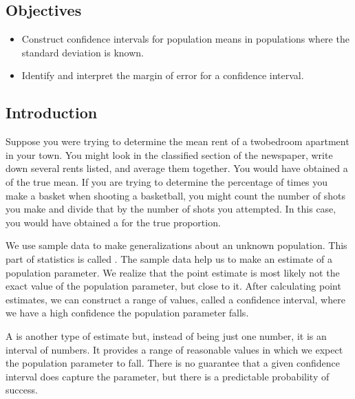 \documentclass[letterpaper,10pt,english]{jupyterBook}
\begin{document}
\subsection{Objectives}
\label{\detokenize{Ch5 Confidence Intervals/5.1 Estimating Population Means (Sigma Known):objectives}}\begin{itemize}
\item {} 
\sphinxAtStartPar
Construct confidence intervals for population means in populations where the standard deviation is known.

\item {} 
\sphinxAtStartPar
Identify and interpret the margin of error for a confidence interval.

\end{itemize}


\subsection{Introduction}
\label{\detokenize{Ch5 Confidence Intervals/5.1 Estimating Population Means (Sigma Known):introduction}}
\sphinxAtStartPar
Suppose you were trying to determine the mean rent of a two\sphinxhyphen{}bedroom apartment in your town. You might look in the classified section of the newspaper, write down several rents listed, and average them together. You would have obtained a  of the true mean. If you are trying to determine the percentage of times you make a basket when shooting a basketball, you might count the number of shots you make and divide that by the number of shots you attempted. In this case, you would have obtained a  for the true proportion.

\sphinxAtStartPar
We use sample data to make generalizations about an unknown population. This part of statistics is called . The sample data help us to make an estimate of a population parameter. We realize that the point estimate is most likely not the exact value of the population parameter, but close to it. After calculating point estimates, we can construct a range of values, called a confidence interval, where we have a high confidence the population parameter falls.

\sphinxAtStartPar
A  is another type of estimate but, instead of being just one number, it is an interval of numbers. It provides a range of reasonable values in which we expect the population parameter to fall. There is no guarantee that a given confidence interval does capture the parameter, but there is a predictable probability of success.
\end{document}
